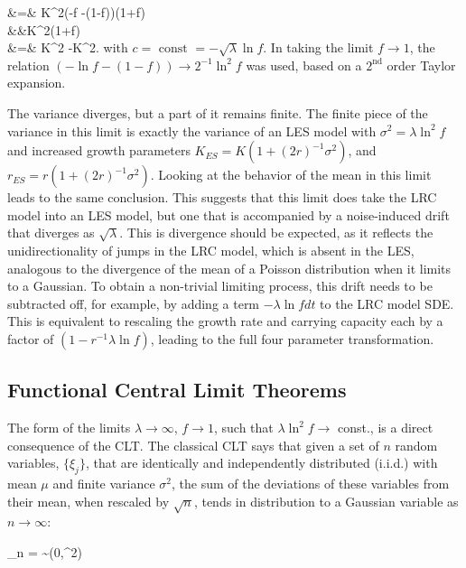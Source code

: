 \bea
\Var[X] &=& K^2(-\ln f -(1-f))\left(1+\ln f\right)\nonumber\\ 
&&K^2\left(1+\ln f\right)\nonumber\\
&=&  K^2 -K^2\sqrt{\lambda}.
\eea
\noindent with $c = \text{ const } = -\sqrt{\lambda}\ln f$.  In taking the limit $f\to1$, the relation $(-\ln f -(1-f)) \to 2^{-1}\ln^2f$ was used, based on a $2^{\text{nd}}$ order Taylor expansion.  

The variance diverges, but a part of it remains finite.  The finite piece of the variance in this limit is exactly the variance of an LES model with $\sigma^2 = \lambda\ln^2 f$ and increased growth parameters $K_{ES} = K(1+(2r)^{-1}\sigma^2)$, and $r_{ES} = r(1+(2r)^{-1}\sigma^2)$.  Looking at the behavior of the mean in this limit leads to the same conclusion.  This suggests that this limit does take the LRC model into an LES model, but one that is accompanied by a noise-induced drift that diverges as $\sqrt{\lambda}$.  This is divergence should be expected, as it reflects the unidirectionality of jumps in the LRC model, which is absent in the LES, analogous to the divergence of the mean of a Poisson distribution when it limits to a Gaussian.  To obtain a non-trivial limiting process, this drift needs to be subtracted off, for example, by adding a term $-\lambda\ln f dt$ to the LRC model SDE.  This is equivalent to rescaling the growth rate and carrying capacity each by a factor of $(1-r^{-1}\lambda\ln f)$, leading to the full four parameter transformation.

  
\subsection{Functional Central Limit Theorems}

The form of the limits  $\lambda\to\infty$, $f\to 1$, such that $\lambda\ln^2f\to$ const., is a direct consequence of the CLT.  The classical CLT says that given a set of $n$ random variables, $\{\xi_j\}$, that are identically and independently distributed (i.i.d.) with mean $\mu$ and finite variance $\sigma^2$, the sum of the deviations of these variables from their mean, when rescaled by $\sqrt{n}$, tends in distribution to a Gaussian variable as $n\to\infty$:

\be
\lim_{n\to\infty} = \eta \sim {}(0,\sigma^2)
\ee

